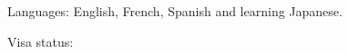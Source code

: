 
\begin{rlist}
  \item Languages: English, French, Spanish and learning Japanese.
  \item Visa status: \myVisa 
\end{rlist}

